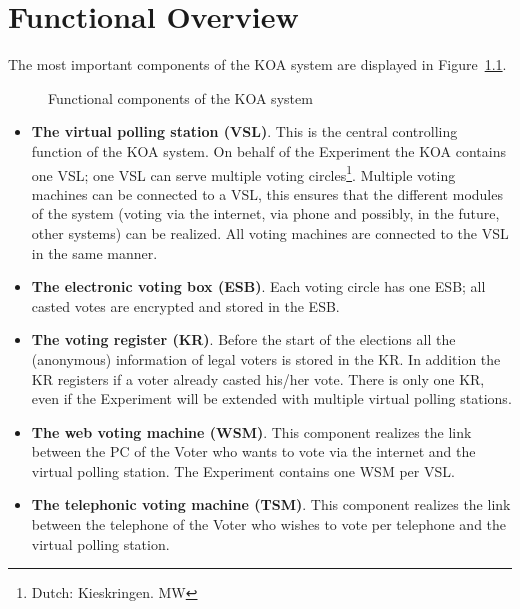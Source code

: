 \chapter{Functional Overview}\label{cha:functional-design}

The most important components of the KOA system are displayed in
Figure~\ref{fig:koa-components}.

\begin{figure}[H]
 \center
    
   \center
\caption{Functional components of the KOA system}
\label{fig:koa-components}
\end{figure}

\begin{itemize}
\item {\bf The virtual polling station (VSL)}. This is the central controlling
      function of the KOA system. On behalf of the Experiment the KOA
      contains one VSL; one VSL can serve multiple voting
      circles\footnote{Dutch: Kieskringen. MW}. Multiple voting machines
      can be connected to a VSL, this ensures that the different
      modules of the system (voting via the internet, via phone and
      possibly, in the future, other systems) can be realized. All
      voting machines are connected to the VSL in the same manner.

\item {\bf The electronic voting box (ESB)}. Each voting circle has one 
      ESB; all casted votes are encrypted and stored in the ESB.

\item {\bf The voting register (KR)}. Before the start of the elections 
      all the (anonymous) information of legal voters is stored in the
      KR. In addition the KR registers if a voter already casted
      his/her vote. There is only one KR, even if the Experiment will
      be extended with multiple virtual polling stations.

\item {\bf The web voting machine (WSM)}. This component realizes the 
      link between the PC of the Voter who wants to vote via the
      internet and the virtual polling station. The Experiment
      contains one WSM per VSL.

\item {\bf The telephonic voting machine (TSM)}. This component realizes 
      the link between the telephone of the Voter who wishes to vote
      per telephone and the virtual polling station.
\end{itemize}

